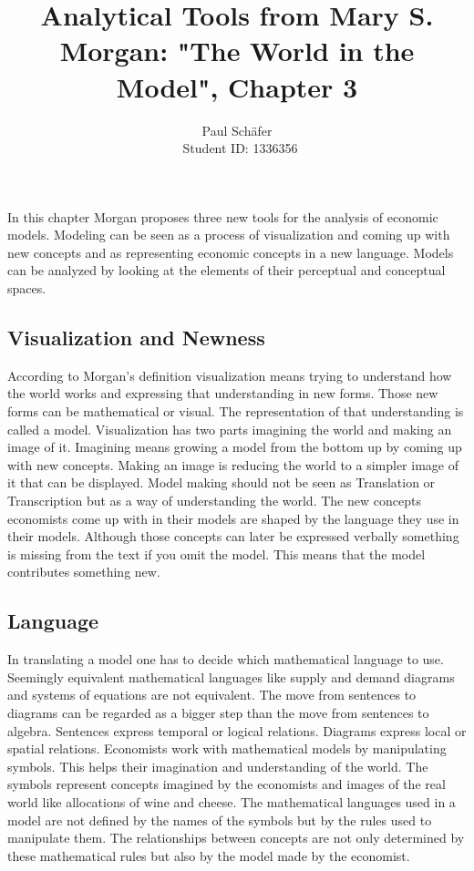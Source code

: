 \documentclass[a4paper, 12pt]{article}
\author{Paul Sch\"afer \\\ Student ID: 1336356}
\begin{document}
\title{Analytical Tools from Mary S. Morgan: "The World in the Model", Chapter 3}
\maketitle
In this chapter Morgan proposes three new tools for the analysis of economic models. Modeling can be seen as a process of visualization and coming up with new concepts and as representing economic concepts in a new language. Models can be analyzed by looking at the elements of their perceptual and conceptual spaces.

\subsection*{Visualization and Newness}
According to Morgan's definition visualization means trying to understand how the world works and expressing that understanding in new forms. Those new forms can be mathematical or visual. The representation of that understanding is called a model. Visualization has two parts imagining the world and making an image of it. Imagining means growing a model from the bottom up by coming up with new concepts. Making an image is reducing the world to a simpler image of it that can be displayed. Model making should not be seen as Translation or Transcription but as a way of understanding the world. The new concepts economists come up with in their models are shaped by the language they use in their models. Although those concepts can later be expressed verbally something is missing from the text if you omit the model. This means that the model contributes something new.

\subsection*{Language}
In translating a model one has to decide which mathematical language to use. Seemingly equivalent mathematical languages like supply and demand diagrams and systems of equations are not equivalent. The move from sentences to diagrams can be regarded as a bigger step than the move from sentences to algebra. Sentences express temporal or logical relations. Diagrams express local or spatial relations. 
Economists work with mathematical models by manipulating symbols. This helps their imagination and understanding of the world. The symbols represent concepts imagined by the economists and images of the real world like allocations of wine and cheese. The mathematical languages used in a model are not defined by the names of the symbols but by the rules used to manipulate them.
The relationships between concepts are not only determined by these mathematical rules but also by the model made by the economist. 
\end{document}

